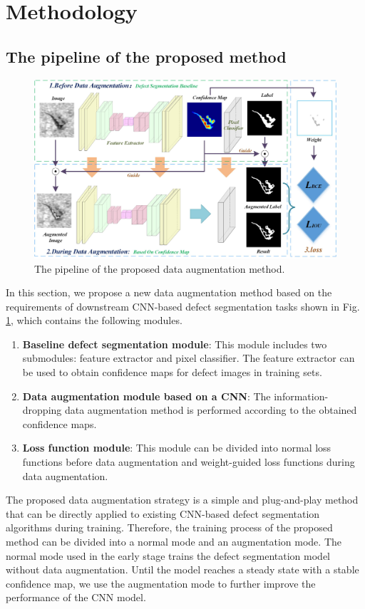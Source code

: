 \documentclass[sn-mathphys]{sn-jnl}%
\theoremstyle{thmstyleone}%
\theoremstyle{thmstyletwo}%
\theoremstyle{thmstylethree}%
\begin{document}
\section{Methodology}\label{sec:met}
\subsection{The pipeline of the proposed method}\label{sec:In}

\begin{figure}
\centering
\includegraphics[width=4.5in]{fig4.jpg}
\caption{The pipeline of the proposed data augmentation method.}\label{fig:3.1}
\end{figure}

In this section, we propose a new data augmentation method based on the requirements of downstream CNN-based defect segmentation tasks shown in Fig. \ref{fig:3.1}, which contains the following modules.
\begin{enumerate}[1)]
\item \textbf{Baseline defect segmentation module}: This module includes two submodules: feature extractor and pixel classifier. The feature extractor can be used to obtain confidence maps for defect images in training sets.
\item \textbf{Data augmentation module based on a CNN}: The information-dropping data augmentation method is performed according to the obtained confidence maps.
\item \textbf{Loss function module}: This module can be divided into normal loss functions before data augmentation and weight-guided loss functions during data augmentation.
\end{enumerate}
The proposed data augmentation strategy is a simple and plug-and-play method that can be directly applied to existing CNN-based defect segmentation algorithms during training. Therefore, the training process of the proposed method can be divided into a normal mode and an augmentation mode. The normal mode used in the early stage trains the defect segmentation model without data augmentation. Until the model reaches a steady state with a stable confidence map, we use the augmentation mode to further improve the performance of the CNN model. 
\end{document}
